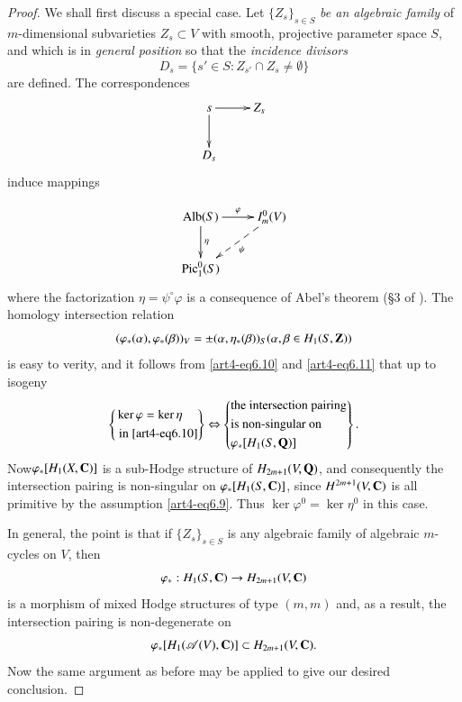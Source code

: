 \begin{proof}
We shall first discuss a special case. Let $\{Z_s\}_{s \in S}$ \textit{be an algebraic family} of $m$-dimensional subvarieties $Z_s \subset V$ with smooth, projective parameter space $S$, and which is in \textit{general position} so that the \textit{incidence divisors}
$$
D_s = \{s' \in S: Z_{s'} \cap Z_s \neq \emptyset\}
$$
are defined. The correspondences
\begin{equation*}
\vcenter{
\xymatrix{
s \ar[r] \ar[d] & Z_s \\
D_s & }}
\end{equation*}
induce mappings 

\begin{equation}
\vcenter{
\xymatrix{
\text{Alb}(S) \ar[r]^-{\varphi} \ar[d]^-{\eta} & I^0_m(V) \ar@{-->}[dl]^-{\psi}\\
\Pic^0_1 (S) &}} \label{art4-eq6.10}
\end{equation}
where the factorization $\eta= \psi^\circ \varphi$  is a consequence of Abel's theorem (\S 3 of \cite{art4-key22}). The homology intersection relation
\begin{equation}
(\varphi_\ast (\alpha), \varphi_\ast (\beta))_V = \pm (\alpha, \eta_\ast (\beta))_S (\alpha, \beta \in H_1 (S, \mathbf{Z})) \label{art4-eq6.11}
\end{equation}
is easy to verity, and it follows from \eqref{art4-eq6.10} and \eqref{art4-eq6.11} that up to isogeny 
\begin{equation}
\left\{
\begin{aligned}
&\ker \varphi = \ker \eta\\
&\text{ in \eqref{art4-eq6.10}}
\end{aligned}
\right\}
\Leftrightarrow 
\left\{
\begin{aligned}
&\text{the intersection pairing}\\
&\text{is non-singular on}\\
&\varphi_\ast [H_1 (S, \mathbf{Q})]
\end{aligned}
\right\}.
\label{art4-eq6.12}
\end{equation}
Now\pageoriginale $\varphi_\ast [H_1 (X, \mathbf{C})]$ is a sub-Hodge structure of $H_{2m+1} (V, \mathbf{Q})$, and consequently the intersection pairing is non-singular on $\varphi_\ast [H_1(S,\mathbf{C})]$, since $H^{2m+1} (V, \mathbf{C})$ is all primitive by the assumption \eqref{art4-eq6.9}. Thus $\ker \varphi^0 = \ker \eta^0$ in this case.

In general, the point is that if $\{Z_s\}_{s \in S}$ is any algebraic family of algebraic $m$-cycles on $V$, then 
$$
\varphi_\ast: H_1 (S, \mathbf{C}) \to H_{2m+1} (V, \mathbf{C})
$$
is a morphism of mixed Hodge structures of type $(m,m)$ and, as a result, the intersection pairing is non-degenerate on
$$
\varphi_\ast [H_1 (\mathscr{A}(V), \mathbf{C})] \subset H_{2m+1} (V, \mathbf{C}).
$$
Now the same argument as before may be applied to give our desired conclusion.
\end{proof}

